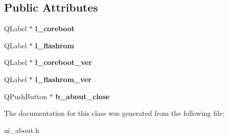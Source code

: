 \subsection*{Public Attributes}
\begin{DoxyCompactItemize}
\item 
\hypertarget{classUi__About_a785a67615301b1e09088e6b3b7becb2c}{Q\-Label $\ast$ {\bfseries l\-\_\-coreboot}}\label{classUi__About_a785a67615301b1e09088e6b3b7becb2c}

\item 
\hypertarget{classUi__About_adb3ba739fbbba64ea5da44ab36ed93a4}{Q\-Label $\ast$ {\bfseries l\-\_\-flashrom}}\label{classUi__About_adb3ba739fbbba64ea5da44ab36ed93a4}

\item 
\hypertarget{classUi__About_a46e929541dfcfcdae02585dd383fad53}{Q\-Label $\ast$ {\bfseries l\-\_\-coreboot\-\_\-ver}}\label{classUi__About_a46e929541dfcfcdae02585dd383fad53}

\item 
\hypertarget{classUi__About_acda4030ceb0520d40f60573e74fcf346}{Q\-Label $\ast$ {\bfseries l\-\_\-flashrom\-\_\-ver}}\label{classUi__About_acda4030ceb0520d40f60573e74fcf346}

\item 
\hypertarget{classUi__About_ab10fb3449495d26cdb07b48ee1b921f9}{Q\-Push\-Button $\ast$ {\bfseries b\-\_\-about\-\_\-close}}\label{classUi__About_ab10fb3449495d26cdb07b48ee1b921f9}

\end{DoxyCompactItemize}


The documentation for this class was generated from the following file\-:\begin{DoxyCompactItemize}
\item 
ui\-\_\-about.\-h\end{DoxyCompactItemize}
